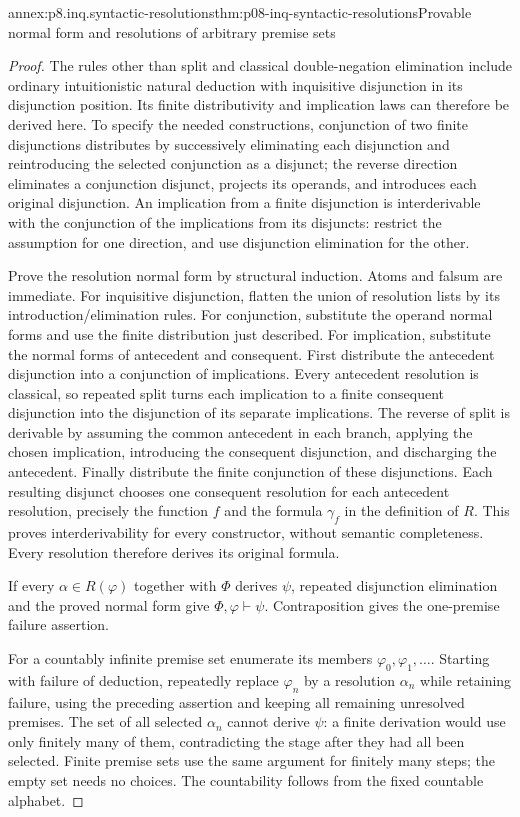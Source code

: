 \begin{annexitem}{annex:p8.inq.syntactic-resolutions}{thm:p08-inq-syntactic-resolutions}{Provable normal form and resolutions of arbitrary premise sets}
\begin{proof}
The rules other than split and classical double-negation elimination
include ordinary intuitionistic natural deduction with inquisitive
disjunction in its disjunction position. Its finite distributivity and
implication laws can therefore be derived here. To specify the needed
constructions, conjunction of two finite disjunctions distributes by
successively eliminating each disjunction and reintroducing the selected
conjunction as a disjunct; the reverse direction eliminates a conjunction
disjunct, projects its operands, and introduces each original disjunction.
An implication from a finite disjunction is interderivable with the
conjunction of the implications from its disjuncts: restrict the assumption
for one direction, and use disjunction elimination for the other.

Prove the resolution normal form by structural induction. Atoms and falsum
are immediate. For inquisitive disjunction, flatten the union of resolution
lists by its introduction/elimination rules. For conjunction, substitute
the operand normal forms and use the finite distribution just described.
For implication, substitute the normal forms of antecedent and consequent.
First distribute the antecedent disjunction into a conjunction of
implications. Every antecedent resolution is classical, so repeated split
turns each implication to a finite consequent disjunction into the
disjunction of its separate implications. The reverse of split is
derivable by assuming the common antecedent in each branch, applying
the chosen implication, introducing the consequent disjunction, and
discharging the antecedent. Finally distribute the finite conjunction of
these disjunctions. Each resulting disjunct chooses one consequent
resolution for each antecedent resolution, precisely the function
\(f\) and the formula \(\gamma_f\) in the definition of \(R\).
This proves interderivability for every constructor, without semantic
completeness. Every resolution therefore derives its original formula.

If every \(\alpha\in R(\varphi)\) together with \(\Phi\) derives
\(\psi\), repeated disjunction elimination and the proved normal form
give \(\Phi,\varphi\vdash\psi\). Contraposition gives the one-premise
failure assertion.

For a countably infinite premise set enumerate its members
\(\varphi_0,\varphi_1,\ldots\). Starting with failure of deduction,
repeatedly replace \(\varphi_n\) by a resolution \(\alpha_n\) while
retaining failure, using the preceding assertion and keeping all remaining
unresolved premises. The set of all selected \(\alpha_n\) cannot derive
\(\psi\): a finite derivation would use only finitely many of them,
contradicting the stage after they had all been selected. Finite premise
sets use the same argument for finitely many steps; the empty set needs
no choices. The countability follows from the fixed countable alphabet.


\end{proof}
\end{annexitem}
